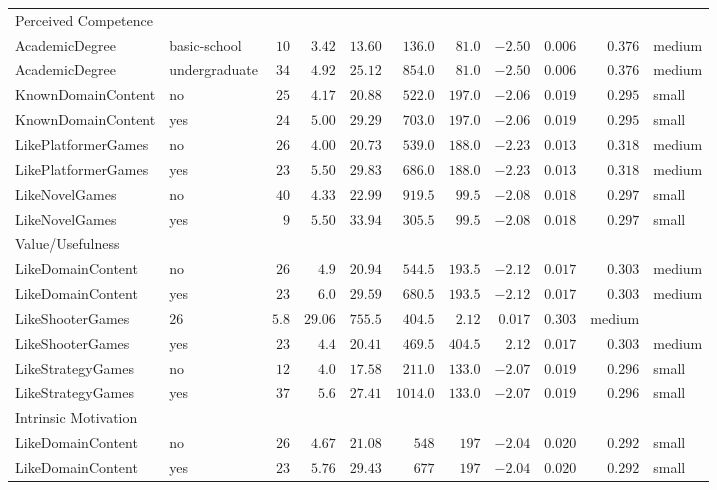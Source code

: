 \documentclass[6pt]{article}
\begin{document}
\begin{landscape}
{\begin{longtable}{llrrrrrrrrl}
Perceived Competence & & & & & & & & & & \tabularnewline
AcademicDegree&basic-school&$10$&$3.42$&$13.60$&$ 136.0$&$ 81.0$&$-2.50$&$0.006$&$0.376$&medium\tabularnewline
AcademicDegree&undergraduate&$34$&$4.92$&$25.12$&$ 854.0$&$ 81.0$&$-2.50$&$0.006$&$0.376$&medium\tabularnewline

KnownDomainContent&no&$25$&$4.17$&$20.88$&$ 522.0$&$197.0$&$-2.06$&$0.019$&$0.295$&small\tabularnewline
KnownDomainContent&yes&$24$&$5.00$&$29.29$&$ 703.0$&$197.0$&$-2.06$&$0.019$&$0.295$&small\tabularnewline

LikePlatformerGames&no&$26$&$4.00$&$20.73$&$ 539.0$&$188.0$&$-2.23$&$0.013$&$0.318$&medium\tabularnewline
LikePlatformerGames&yes&$23$&$5.50$&$29.83$&$ 686.0$&$188.0$&$-2.23$&$0.013$&$0.318$&medium\tabularnewline

LikeNovelGames&no&$40$&$4.33$&$22.99$&$ 919.5$&$ 99.5$&$-2.08$&$0.018$&$0.297$&small\tabularnewline
LikeNovelGames&yes&$ 9$&$5.50$&$33.94$&$ 305.5$&$ 99.5$&$-2.08$&$0.018$&$0.297$&small\tabularnewline
\hline
\newpage

Value/Usefulness & & & & & & & & & & \tabularnewline
LikeDomainContent&no&$26$&$4.9$&$20.94$&$ 544.5$&$193.5$&$-2.12$&$0.017$&$0.303$&medium\tabularnewline
LikeDomainContent&yes&$23$&$6.0$&$29.59$&$ 680.5$&$193.5$&$-2.12$&$0.017$&$0.303$&medium\tabularnewline

LikeShooterGames&$26$&$5.8$&$29.06$&$ 755.5$&$404.5$&$ 2.12$&$0.017$&$0.303$&medium\tabularnewline
LikeShooterGames&yes&$23$&$4.4$&$20.41$&$ 469.5$&$404.5$&$ 2.12$&$0.017$&$0.303$&medium\tabularnewline

LikeStrategyGames&no&$12$&$4.0$&$17.58$&$ 211.0$&$133.0$&$-2.07$&$0.019$&$0.296$&small\tabularnewline
LikeStrategyGames&yes&$37$&$5.6$&$27.41$&$1014.0$&$133.0$&$-2.07$&$0.019$&$0.296$&small\tabularnewline

\hline

Intrinsic Motivation & & & & & & & & & & \tabularnewline
LikeDomainContent&no&$26$&$4.67$&$21.08$&$548$&$197$&$-2.04$&$0.020$&$0.292$&small\tabularnewline
LikeDomainContent&yes&$23$&$5.76$&$29.43$&$677$&$197$&$-2.04$&$0.020$&$0.292$&small\tabularnewline
\hline
\end{longtable}}
\end{landscape}
\end{document}
